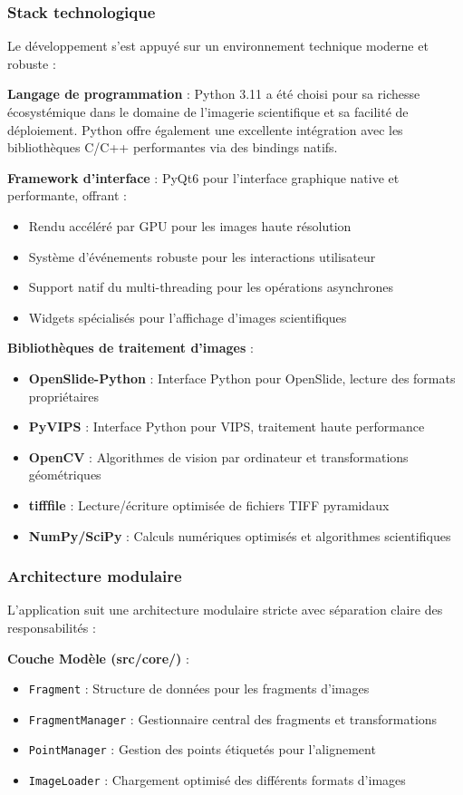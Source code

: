 \documentclass[12pt,a4paper]{report}
\begin{document}
\begin{}
\begin{}
\begin{}
\begin{}
\subsubsection{Stack technologique}

Le développement s'est appuyé sur un environnement technique moderne et robuste :

\textbf{Langage de programmation} : Python 3.11 a été choisi pour sa richesse écosystémique dans le domaine de l'imagerie scientifique et sa facilité de déploiement. Python offre également une excellente intégration avec les bibliothèques C/C++ performantes via des bindings natifs.

\textbf{Framework d'interface} : PyQt6 pour l'interface graphique native et performante, offrant :
\begin{itemize}
\item Rendu accéléré par GPU pour les images haute résolution
\item Système d'événements robuste pour les interactions utilisateur
\item Support natif du multi-threading pour les opérations asynchrones
\item Widgets spécialisés pour l'affichage d'images scientifiques
\end{itemize}

\textbf{Bibliothèques de traitement d'images} :
\begin{itemize}
\item \textbf{OpenSlide-Python} : Interface Python pour OpenSlide, lecture des formats propriétaires
\item \textbf{PyVIPS} : Interface Python pour VIPS, traitement haute performance
\item \textbf{OpenCV} : Algorithmes de vision par ordinateur et transformations géométriques
\item \textbf{tifffile} : Lecture/écriture optimisée de fichiers TIFF pyramidaux
\item \textbf{NumPy/SciPy} : Calculs numériques optimisés et algorithmes scientifiques
\end{itemize}

\subsubsection{Architecture modulaire}

L'application suit une architecture modulaire stricte avec séparation claire des responsabilités :

\textbf{Couche Modèle (src/core/)} :
\begin{itemize}
\item \texttt{Fragment} : Structure de données pour les fragments d'images
\item \texttt{FragmentManager} : Gestionnaire central des fragments et transformations
\item \texttt{PointManager} : Gestion des points étiquetés pour l'alignement
\item \texttt{ImageLoader} : Chargement optimisé des différents formats d'images
\end{itemize}


\end{}
\end{}
\end{}
\end{}
\end{document}
